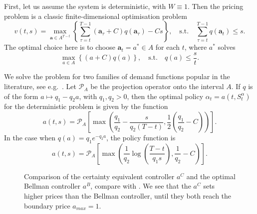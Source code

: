 \documentclass[main.tex]{subfiles}
\begin{document}
First, let us assume the system is deterministic, with
$W\equiv 1$.
Then the pricing problem is a classic finite-dimensional optimisation
problem
\begin{equation}
  v(t,s)=\max_{\mathbf a\in A^{T-t}}\left\{\sum_{\tau=t}^{T-1}(\mathbf
    a_\tau+C)q(\mathbf a_\tau)-Cs\right\},
  \quad \text{s.t.}\quad \sum_{\tau=t}^{T-1}q(\mathbf a_t)\leq s.
\end{equation}
The optimal choice here is to choose $\mathbf a_t=a^*\in A$ for each
$t$, where $a^*$ solves
\begin{equation}
  \max_{a\in A} \left\{(a+C)q(a)\right\},\quad\text{s.t.}\quad
  q(a)\leq \frac{s}{t}.
\end{equation}

We solve the problem for two families of demand functions popular in
the literature, see e.g.~\citep[Ch.~7]{talluri2006theory}.
Let $\mathcal P_A$ be the projection operator onto the interval $A$.
If $q$ is of the form $a\mapsto q_1-q_2a$, with $q_1,q_2> 0$, then
the optimal policy $\alpha_t=a(t,S_t^\alpha)$ for the deterministic
problem is given by the function
\begin{equation}
  a(t,s)=\mathcal P_A \left[ \max\left(
      \frac{q_1}{q_2}-\frac{s}{q_2(T-t)},\frac{1}{2}\left(\frac{q_1}{q_2}-C
      \right) \right) \right].
\end{equation}
In the case when $q(a)=q_1e^{-q_2a}$, the policy function is
\begin{equation}
  a(t,s)=\mathcal P_A\left[
    \max\left( \frac{1}{q_2}\log\left( \frac{T-t}{q_1s}\right),
      \frac{1}{q_2}-C  \right)\right].
\end{equation}

\begin{figure}[htbp]
  \centering
  \caption{Comparison of the certainty equivalent controller $a^C$ and
    the optimal Bellman controller $a^B$, compare with
    .
    We see that the $a^C$ sets
    higher prices than the Bellman controller, until they both reach the
    boundary price $a_{max}=1$.
  }\label{fig:bellman_det_policy_difference}
\end{figure}
\end{document}
